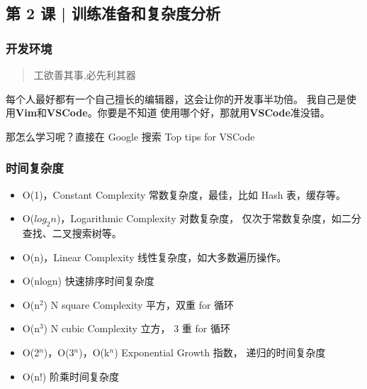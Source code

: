 \subsection{第 2 课 | 训练准备和复杂度分析}

\subsubsection{开发环境}

\begin{quote}
工欲善其事,必先利其器
\end{quote}

每个人最好都有一个自己擅长的编辑器，这会让你的开发事半功倍。
我自己是使用\textbf{Vim}和\textbf{VSCode}。你要是不知道
使用哪个好，那就用\textbf{VSCode}准没错。

那怎么学习呢？直接在 Google 搜索 Top tips for VSCode

\subsubsection{时间复杂度}

\begin{itemize}
  \item O(1)，Constant Complexity 常数复杂度，最佳，比如 Hash 表，缓存等。
  \item O($log_2 n$)，Logarithmic Complexity 对数复杂度，
    仅次于常数复杂度，如二分查找、二叉搜索树等。
  \item O(n)，Linear Complexity 线性复杂度，如大多数遍历操作。
  \item O(nlogn) 快速排序时间复杂度
  \item O(n$^{2}$) N square Complexity 平方，双重 for 循环
  \item O(n$^{3}$) N cubic Complexity 立方， 3 重 for 循环
  \item O(2$^{n}$)，O(3$^{n}$)，O(k$^{n}$) Exponential Growth 指数，
    递归的时间复杂度
  \item O(n!) 阶乘时间复杂度
\end{itemize}
